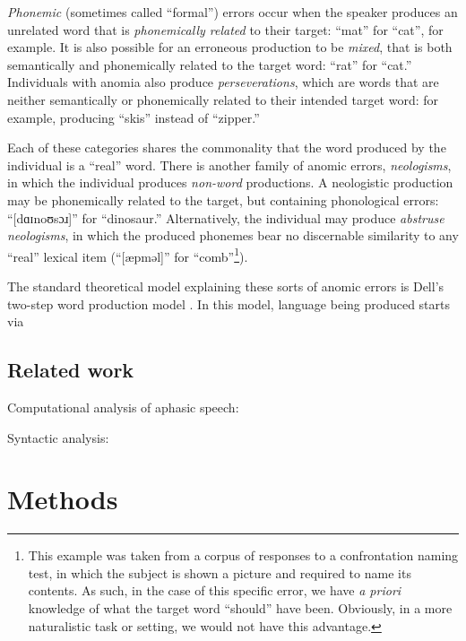 \documentclass[11pt,letterpaper]{article}
\begin{document}
\emph{Phonemic} (sometimes called ``formal'') errors occur when the speaker produces an unrelated word that is \emph{phonemically related} to their target: ``mat'' for ``cat'', for example. 
It is also possible for an erroneous production to be \emph{mixed}, that is both semantically and phonemically related to the target word: ``rat'' for ``cat.''
Individuals with anomia also produce \emph{perseverations}, which are words that are neither semantically or phonemically related to their intended target word: for example, producing ``skis'' instead of ``zipper.''

Each of these categories shares the commonality that the word produced by the individual is a ``real'' word. There is another family of anomic errors, \emph{neologisms}, in which the individual produces \emph{non-word} productions. 
A neologistic production may be phonemically related to the target, but containing phonological errors: ``[dɑɪnoʊsɔɹ]'' for ``dinosaur.'' 
Alternatively, the individual may produce \emph{abstruse neologisms}, in which the produced phonemes bear no discernable similarity to any ``real'' lexical item (``[æpməl]'' for ``comb''\footnote{This example was taken from a corpus of responses to a confrontation naming test, in which the subject is shown a picture and required to name its contents. As such, in the case of this specific error, we have \emph{a priori} knowledge of what the target word ``should'' have been. Obviously, in a more naturalistic task or setting, we would not have this advantage.}).

The standard theoretical model explaining these sorts of anomic errors is Dell's two-step word production model \cite{Dell:1997wj,Dell:1986vk}. 
In this model, language being produced starts via


\subsection{Related work} %
\label{sub:related_work}

Computational analysis of aphasic speech: \cite{MacWhinney:2011er} \cite{Goodglass:1994dp} \cite{Fraser:2014bg} \cite{fraser-EtAl:2014:W14-34}

Syntactic analysis: \cite{Goodglass:1994dp}


\section{Methods}
\end{document}
